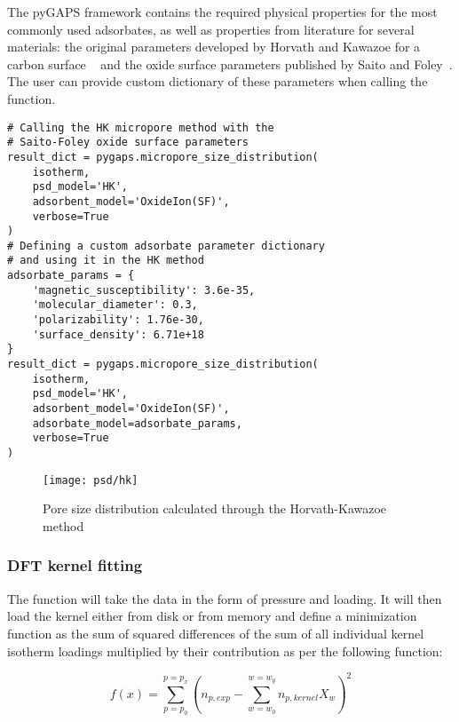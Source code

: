 The pyGAPS framework contains the required physical properties for the most commonly
used adsorbates, as well as properties from literature for several materials: 
the original parameters developed by Horvath and Kawazoe for a carbon surface
~\cite{horvathMethodCalculationEffective1983} and the oxide surface parameters
published by Saito and Foley~\cite{saitoCurvatureParametricSensitivity1991}.
The user can provide custom dictionary of these parameters when calling the 
function. 

\begin{lstlisting}[caption={Using the HK method for PSD},label={pyg:lst:hkpsd}]
# Calling the HK micropore method with the 
# Saito-Foley oxide surface parameters
result_dict = pygaps.micropore_size_distribution(
    isotherm,
    psd_model='HK',
    adsorbent_model='OxideIon(SF)',
    verbose=True
)
# Defining a custom adsorbate parameter dictionary 
# and using it in the HK method
adsorbate_params = {
    'magnetic_susceptibility': 3.6e-35,
    'molecular_diameter': 0.3,
    'polarizability': 1.76e-30,
    'surface_density': 6.71e+18
}
result_dict = pygaps.micropore_size_distribution(
    isotherm,
    psd_model='HK',
    adsorbent_model='OxideIon(SF)',
    adsorbate_model=adsorbate_params,
    verbose=True
)

\end{lstlisting}

\begin{figure}[h!]
    \texttt{[image: psd/hk]}
    \caption{Pore size distribution calculated through the Horvath-Kawazoe method}%
    \label{fig:pyg:fig:hk}
\end{figure}

\subsubsection{DFT kernel fitting}

The function will take the data in the form of pressure and loading. It will
then load the kernel either from disk or from memory and define a minimization
function as the sum of squared differences of the sum of all individual kernel
isotherm loadings multiplied by their contribution as per the following function:

\begin{equation}
    f(x) = \sum_{p=p_0}^{p=p_x} (n_{p,exp} - \sum_{w=w_0}^{w=w_y} n_{p, kernel} X_w )^2
\end{equation}